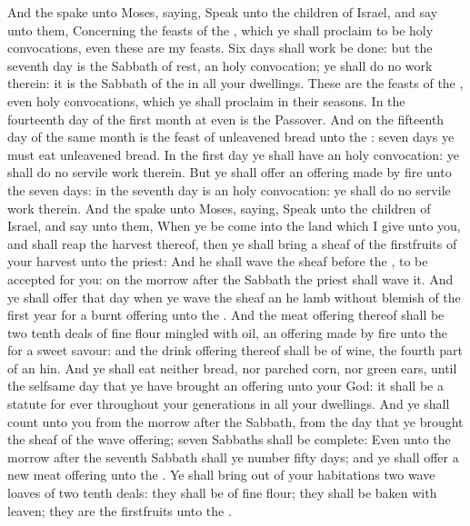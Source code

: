 \begin{biblechapter} %
 And the \LORD spake unto Moses, saying,
\verse Speak unto the children of Israel, and say unto them, Concerning the feasts of the \LORD, which ye shall proclaim to be holy convocations, even these are my feasts.
 Six days shall work be done: but the seventh day is the Sabbath of rest, an holy convocation; ye shall do no work therein: it is the Sabbath of the \LORD in all your dwellings.
 These are the feasts of the \LORD, even holy convocations, which ye shall proclaim in their seasons.
\verse In the fourteenth day of the first month at even is the \LORDs Passover.
\verse And on the fifteenth day of the same month is the feast of unleavened bread unto the \LORD: seven days ye must eat unleavened bread.
\verse In the first day ye shall have an holy convocation: ye shall do no servile work therein.
\verse But ye shall offer an offering made by fire unto the \LORD seven days: in the seventh day is an holy convocation: ye shall do no servile work therein.
 And the \LORD spake unto Moses, saying,
\verse Speak unto the children of Israel, and say unto them, When ye be come into the land which I give unto you, and shall reap the harvest thereof, then ye shall bring a sheaf of the firstfruits of your harvest unto the priest:
\verse And he shall wave the sheaf before the \LORD, to be accepted for you: on the morrow after the Sabbath the priest shall wave it.
\verse And ye shall offer that day when ye wave the sheaf an he lamb without blemish of the first year for a burnt offering unto the \LORD.
\verse And the meat offering thereof shall be two tenth deals of fine flour mingled with oil, an offering made by fire unto the \LORD for a sweet savour: and the drink offering thereof shall be of wine, the fourth part of an hin.
\verse And ye shall eat neither bread, nor parched corn, nor green ears, until the selfsame day that ye have brought an offering unto your God: it shall be a statute for ever throughout your generations in all your dwellings.
 And ye shall count unto you from the morrow after the Sabbath, from the day that ye brought the sheaf of the wave offering; seven Sabbaths shall be complete:
\verse Even unto the morrow after the seventh Sabbath shall ye number fifty days; and ye shall offer a new meat offering unto the \LORD.
\verse Ye shall bring out of your habitations two wave loaves of two tenth deals: they shall be of fine flour; they shall be baken with leaven; they are the firstfruits unto the \LORD.

\end{biblechapter}
